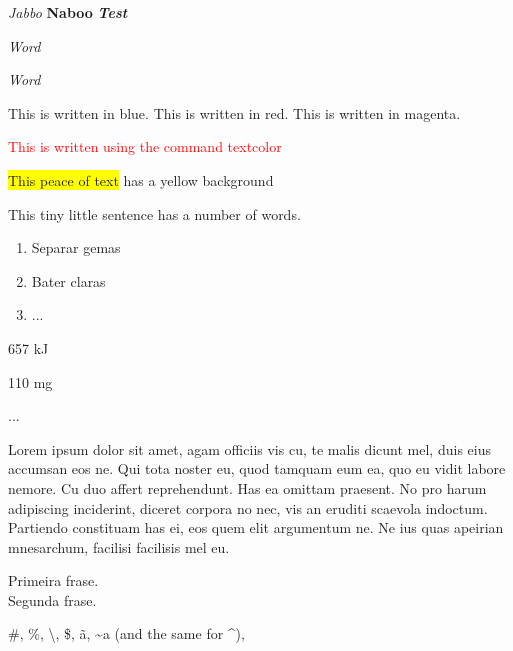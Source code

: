 \documentclass[a4paper, 12pt]{report}
\begin{document}
  \textit{Jabbo}
  \textbf{Naboo}
  \textit{\textbf{Test}}

  \emph{Word}

  \emph{\emph{Word}}

  \color{blue}
  This is written in blue.
  \color{red}
  This is written in red.
  \color{magenta}
  This is written in magenta.

  \color{black}
  \textcolor{red}{This is written using the command textcolor}

  \colorbox{yellow}{This peace of text} has a yellow background

  \tiny This \scriptsize tiny \footnotesize little \small sentence \normalsize has \large a \Large number \huge of \Huge words.
  
  \normalsize
  
  \begin{enumerate}
    \item Separar gemas
    \item Bater claras
    \item ...
  \end{enumerate}
  
  \begin{description}
    \item[Energia:] 657 kJ
    \item[Sódio:] 110 mg 
    \item ...  
  \end{description}

  Lorem ipsum dolor sit amet, agam officiis vis cu, te malis dicunt mel, duis eius accumsan eos ne. Qui tota noster eu, quod tamquam eum ea, quo eu vidit labore nemore. Cu duo affert reprehendunt. Has ea omittam praesent. No pro harum adipiscing inciderint, diceret corpora no nec, vis an eruditi scaevola indoctum. Partiendo constituam has ei, eos quem elit argumentum ne. Ne ius quas apeirian mnesarchum, facilisi facilisis mel eu.
  
  Primeira frase. \\
  Segunda frase.  


  \#, \%, \textbackslash, \$, \~a, \~{}a (and the same for \^{}), 
  
\end{document}
